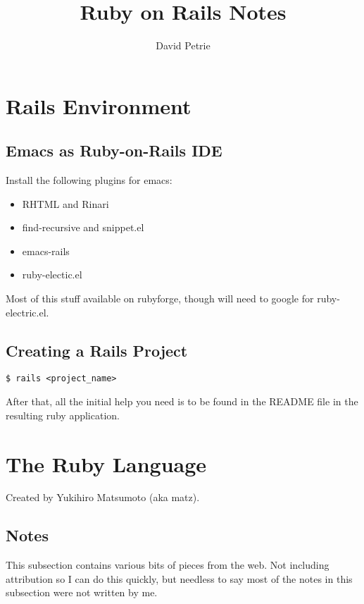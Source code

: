 \documentclass[10pt,twoside,a4paper]{article}
\author{David Petrie}
\title{Ruby on Rails Notes}
\begin{document}
\maketitle


\section{Rails Environment}

\subsection{Emacs as Ruby-on-Rails IDE}

Install the following plugins for emacs:
\begin{itemize}
\item RHTML and Rinari
\item find-recursive and snippet.el
\item emacs-rails
\item ruby-electic.el
\end{itemize}

Most of this stuff available on rubyforge, though will need to google for ruby-electric.el.

\subsection{Creating a Rails Project}

\begin{verbatim}
$ rails <project_name>
\end{verbatim}

After that, all the initial help you need is to be found in the README file in the resulting ruby application.

\section{The Ruby Language}

Created by Yukihiro Matsumoto (aka matz).

\subsection{Notes}

This subsection contains various bits of pieces from the web. Not including attribution so I can do this quickly, but needless to say most of the notes in this subsection were not written by me.
\end{document}
